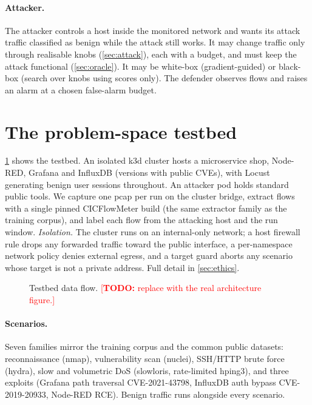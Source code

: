 \documentclass[letterpaper,twocolumn,10pt]{article}
\newcommand{\todo}[1]{\textcolor{red}{[\textbf{TODO:} #1]}}
\begin{document}
\paragraph{Attacker.} The attacker controls a host inside the monitored network
and wants its attack traffic classified as benign while the attack still works.
It may change traffic only through realisable knobs (\cref{sec:attack}), each with
a budget, and must keep the attack functional (\cref{sec:oracle}). It may be
white-box (gradient-guided) or black-box (search over knobs using scores only).
The defender observes flows and raises an alarm at a chosen false-alarm budget.

\section{The problem-space testbed}\label{sec:testbed}
\cref{fig:testbed} shows the testbed. An isolated k3d cluster hosts a
microservice shop, Node-RED, Grafana and InfluxDB (versions with public CVEs),
with Locust generating benign user sessions throughout. An attacker pod holds
standard public tools. We capture one pcap per run on the cluster bridge, extract
flows with a single pinned CICFlowMeter build (the same extractor family as the
training corpus), and label each flow from the attacking host and the run window.
\emph{Isolation.} The cluster runs on an internal-only network; a host firewall
rule drops any forwarded traffic toward the public interface, a per-namespace
network policy denies external egress, and a target guard aborts any scenario
whose target is not a private address. Full detail in \cref{sec:ethics}.

\begin{figure}[t]\centering
{}
\caption{Testbed data flow. \todo{replace with the real architecture figure.}}
\label{fig:testbed}
\end{figure}

\paragraph{Scenarios.} Seven families mirror the training corpus and the common
public datasets: reconnaissance (nmap), vulnerability scan (nuclei), SSH/HTTP
brute force (hydra), slow and volumetric DoS (slowloris, rate-limited hping3),
and three exploits (Grafana path traversal CVE-2021-43798, InfluxDB auth bypass
CVE-2019-20933, Node-RED RCE). Benign traffic runs alongside every scenario.
\end{document}

